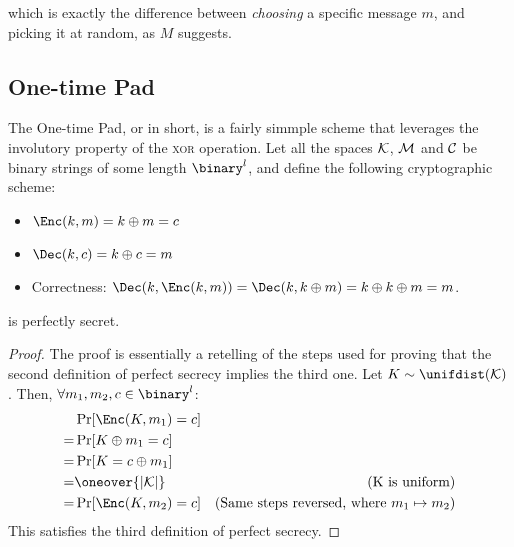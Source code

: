 which is exactly the difference between \emph{choosing} a specific message $m$, and picking it at random, as $M$ suggests.

\subsection{One-time Pad}

The One-time Pad, or \otp{} in short, is a fairly simmple scheme that leverages the involutory property of the \textsc{xor} operation. Let all the spaces $\mathcal{K}$, $\mathcal{M}$ and $\mathcal{C}$ be binary strings of some length $\binary^l$, and define the following cryptographic scheme:
\begin{itemize}
    \item $\Enc(k, m) = k \oplus m = c$
    \item $\Dec(k, c) = k \oplus c = m$
    \item Correctness: $\Dec(k, \Enc(k, m)) = \Dec(k, k \oplus m) = k \oplus k \oplus m = m$.
\end{itemize}

\begin{theorem}
    \otp{} is perfectly secret.
\end{theorem}
\begin{proof}
    The proof is essentially a retelling of the steps used for proving that the second definition of perfect secrecy implies the third one. Let $K \sim \unifdist(\K)$. Then, $\forall m_1, m_2, c \in \binary^l$:
    \begin{align*}
        & \Pr[\Enc(K, m_1) = c]     & \\
        =& \Pr[K \oplus m_1 = c]    & \\
        =& \Pr[K = c \oplus m_1]    & \\
        =& \oneover{|\K|}           & \text{(K is uniform)} \\
        =& \Pr[\Enc(K, m_2) = c]    & \text{(Same steps reversed, where $m_1 \mapsto m_2$)} \\  
    \end{align*}
    This satisfies the third definition of perfect secrecy.
\end{proof}



